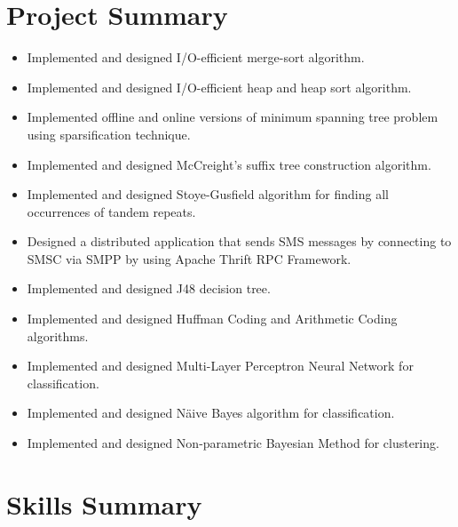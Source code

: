 \documentclass[showupdate]{xqcv}
\begin{document}
\section{Project Summary}
\begin{itemize}
  \item \footnotesize{Implemented and designed I/O-efficient merge-sort algorithm.}
  \item \footnotesize{Implemented and designed I/O-efficient heap and heap sort algorithm.}
  \item \footnotesize{Implemented offline and online versions of minimum spanning tree problem using sparsification technique.}
  \item \footnotesize{Implemented and designed McCreight's suffix tree construction algorithm.}
  \item \footnotesize{Implemented and designed Stoye-Gusfield algorithm for finding all occurrences of tandem repeats.}
  \item \footnotesize{Designed a distributed application that sends SMS messages by connecting to SMSC via SMPP by using Apache Thrift RPC Framework.}
  \item \footnotesize{Implemented and designed J48 decision tree.}
  \item \footnotesize{Implemented and designed Huffman Coding and Arithmetic Coding algorithms.}
  \item \footnotesize{Implemented and designed Multi-Layer Perceptron Neural Network for classification.}
  \item \footnotesize{Implemented and designed N\"{a}ive Bayes algorithm for classification.}
  \item \footnotesize{Implemented and designed Non-parametric Bayesian Method for clustering.}
\end{itemize}

\section{Skills Summary}
\begin{entrylist}
\end{entrylist}
\end{document}
